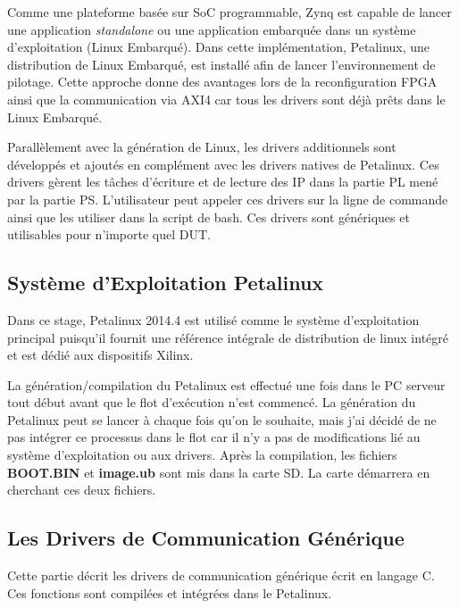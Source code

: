Comme une plateforme basée sur SoC programmable, Zynq est capable de lancer une application \emph{standalone}
ou une application embarquée dans un système d'exploitation (Linux Embarqué). Dans cette implémentation,
Petalinux, une distribution de Linux Embarqué, est installé afin de lancer l'environnement de pilotage.
Cette approche donne des avantages lors de la reconfiguration FPGA ainsi que la communication via
AXI4 car tous les drivers sont déjà prêts dans le Linux Embarqué.

Parallèlement avec la génération de Linux, les drivers additionnels sont développés et ajoutés en complément
avec les drivers natives de Petalinux. Ces drivers gèrent les tâches d'écriture et de lecture des IP dans la partie PL mené
par la partie PS. L'utilisateur peut appeler ces drivers sur la ligne de commande ainsi que les utiliser dans la script
de bash. Ces drivers sont génériques et utilisables pour n'importe quel DUT.


\subsection{Système d'Exploitation Petalinux}

Dans ce stage, Petalinux 2014.4 est utilisé comme le système d'exploitation principal puisqu'il fournit une référence
intégrale de distribution de linux intégré et est dédié aux dispositifs Xilinx.

La génération/compilation du Petalinux est effectué une fois dans le PC serveur tout début avant que le flot d'exécution n'est commencé.
La génération du Petalinux peut se lancer à chaque fois qu'on le souhaite, mais j'ai décidé de ne pas intégrer ce processus dans le flot
car il n'y a pas de modifications lié au système d'exploitation ou aux drivers.
Après la compilation, les fichiers \textbf{BOOT.BIN} et \textbf{image.ub} sont mis dans la carte SD. La carte démarrera
en cherchant ces deux fichiers.

\subsection{Les Drivers de Communication Générique}
\label{subsec:embedded}

Cette partie décrit les drivers de communication générique écrit en langage C. Ces fonctions
sont compilées et intégrées dans le Petalinux.

